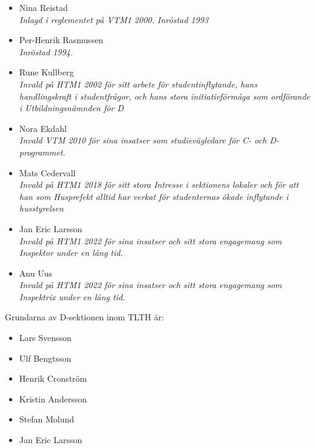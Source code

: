 \documentclass{dsekregulations}
\begin{document}
\begin{parasection}
  \begin{itemize}
    \item Nina Reistad \\
      \emph{Inlagd i reglementet på VTM1 2000. Inröstad 1993}
    \item Per-Henrik Rasmussen \\ \emph{Inröstad 1994.}
    \item Rune Kullberg \\
      \emph{Invald på HTM1 2002 för sitt arbete för studentinflytande, hans
      handlingskraft i studentfrågor, och hans stora initiativförmåga som
      ordförande i Utbildningsnämnden för D}
    \item Nora Ekdahl \\
      \emph{Invald VTM 2010 för sina insatser som studievägledare för C- och
      D-programmet.}
    \item Mats Cedervall \\
      \emph{Invald på HTM1 2018 för sitt stora Intresse i sektionens lokaler och
      för att han som Husprefekt alltid har verkat för studenternas ökade
      inflytande i husstyrelsen}
    \item Jan Eric Larsson \\
      \emph{Invald på HTM1 2022 för sina insatser och sitt stora engagemang som
      Inspektor under en lång tid.}
    \item Anu Uus \\
      \emph{Invald på HTM1 2022 för sina insatser och sitt stora engagemang som
      Inspektrix under en lång tid.}
  \end{itemize}

   Grundarna av D-sektionen inom
  TLTH är:
  \begin{itemize}
  \item Lars Svensson
  \item Ulf Bengtsson
  \item Henrik Cronström
  \item Kristin Andersson
  \item Stefan Molund
  \item Jan Eric Larsson
  \end{itemize}

\end{parasection}
\end{document}
